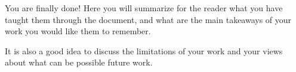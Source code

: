 You are finally done! Here you will summarize for the reader what you
have taught them through the document, and what are the main takeaways
of your work you would like them to remember.

It is also a good idea to discuss the limitations of your work and your
views about what can be possible future work.
